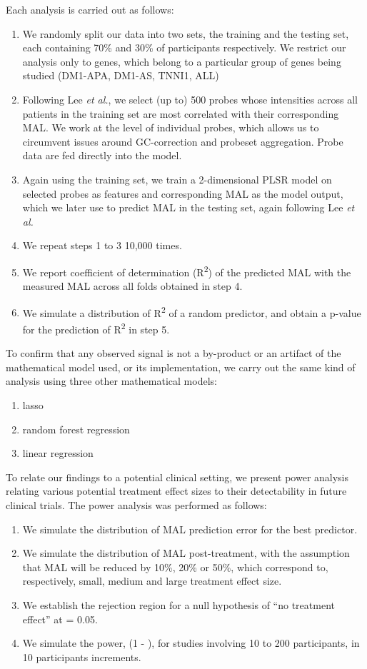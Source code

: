 \documentclass[10pt,letterpaper]{article}
\begin{document}
Each analysis is carried out as follows:

\begin{enumerate}
\item We randomly split our data into two sets, the training and the testing set, each containing 70\% and 30\% of participants respectively. We restrict our analysis only to genes, which belong to a particular group of genes being studied (DM1-APA, DM1-AS, TNNI1, ALL)
\item Following Lee {\it et al.}, we select (up to) 500 probes whose intensities across all patients in the training set are most correlated with their corresponding MAL. We work at the level of individual probes, which allows us to circumvent issues around GC-correction and probeset aggregation. Probe data are fed directly into the model.
\item Again using the training set, we train a 2-dimensional PLSR model on selected probes as features and corresponding MAL as the model output, which we later use to predict MAL in the testing set, again following Lee {\it et al.}
\item We repeat steps 1 to 3 10,000 times.
\item We report coefficient of determination (R\textsuperscript{2}) of the predicted MAL with the measured MAL across all folds obtained in step 4.
\item We simulate a distribution of R\textsuperscript{2} of a random predictor, and obtain a p-value for the prediction of R\textsuperscript{2} in step 5.
\end{enumerate}

To confirm that any observed signal is not a by-product or an artifact of the mathematical model used, or its implementation, we carry out the same kind of analysis using three other mathematical models:

\begin{enumerate}
\item lasso
\item random forest regression
\item linear regression
\end{enumerate}

To relate our findings to a potential clinical setting, we present power analysis relating various potential treatment effect sizes to their detectability in future clinical trials. The power analysis was performed as follows:

\begin{enumerate}
\item We simulate the distribution of MAL prediction error for the best predictor.
\item We simulate the distribution of MAL post-treatment, with the assumption that MAL will be reduced by 10\%, 20\% or 50\%, which correspond to, respectively, small, medium and large treatment effect size.
\item We establish the rejection region for a null hypothesis of ``no treatment effect'' at {\textalpha} = 0.05.
\item We simulate the power, (1 - {\textbeta}), for studies involving 10 to 200 participants, in 10 participants increments.
\end{enumerate}
\end{document}
